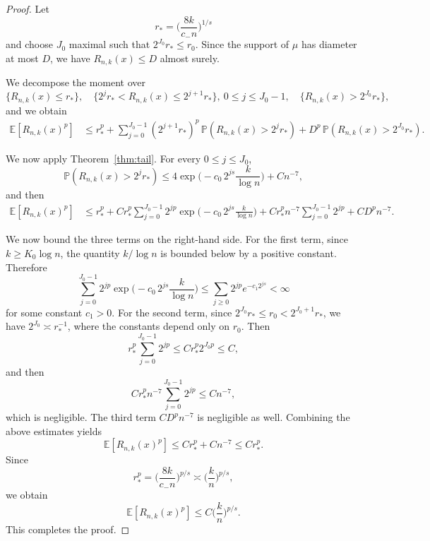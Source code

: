 \documentclass[10pt,a4paper]{amsart}
\begin{document}
\begin{proof}

Let $$r_* = \Big(\frac{8k}{c_- n}\Big)^{1/s}$$ and choose \(J_0\) maximal such that $2^{J_0}r_* \le r_0$. Since the support of \(\mu\) has diameter at most \(D\), we have $R_{n,k}(x)\le D$ almost surely.

We decompose the moment over
\[
\{R_{n,k}(x)\le r_*\},
\quad
\{2^j r_* < R_{n,k}(x)\le 2^{j+1}r_*\},\ 0\le j\le J_0-1,
\quad
\{R_{n,k}(x)>2^{J_0}r_*\},
\]
and we obtain
\begin{align*}
\mathbb E[R_{n,k}(x)^p]
&\le r_*^p
+ \sum_{j=0}^{J_0-1}(2^{j+1}r_*)^p\,\mathbb P(R_{n,k}(x)>2^j r_*) + D^p\,\mathbb P(R_{n,k}(x)>2^{J_0}r_*).
\end{align*}

We now apply Theorem~\ref{thm:tail}. For every \(0\le j\le J_0\),
\[
\mathbb P(R_{n,k}(x)>2^j r_*)
\le
4\exp \Big(-c_0\,2^{js}\frac{k}{\log n}\Big)+Cn^{-7},
\]
and then
\begin{align*}
\mathbb E[R_{n,k}(x)^p]
&\le r_*^p
+ C r_*^p \sum_{j=0}^{J_0-1}2^{jp}
\exp \Big(-c_0\,2^{js}\frac{k}{\log n}\Big) + C r_*^p n^{-7}\sum_{j=0}^{J_0-1}2^{jp}
+ C D^p n^{-7}.
\end{align*}

We now bound the three terms on the right-hand side. For the first term, since \(k\ge K_0\log n\), the quantity \(k/\log n\) is bounded below by a positive constant. Therefore
\[
\sum_{j=0}^{J_0-1}2^{jp}
\exp \Big(-c_0\,2^{js}\frac{k}{\log n}\Big)
\le
\sum_{j\ge 0}2^{jp}e^{-c_1 2^{js}}
<\infty
\]
for some constant \(c_1>0\). For the second term, since \(2^{J_0}r_*\le r_0<2^{J_0+1}r_*\), we have $2^{J_0}\asymp r_*^{-1}$, where the constants depend only on \(r_0\). Then
\[
r_*^p\sum_{j=0}^{J_0-1}2^{jp}
\le
C r_*^p 2^{J_0 p}
\le C,
\]
and then
\[
C r_*^p n^{-7}\sum_{j=0}^{J_0-1}2^{jp}
\le C n^{-7},
\]
which is negligible. The third term \(C D^p n^{-7}\) is negligible as well. Combining the above estimates yields
\[
\mathbb E[R_{n,k}(x)^p]
\le C r_*^p + C n^{-7}
\le C r_*^p.
\]
Since
\[
r_*^p
=
\Big(\frac{8k}{c_- n}\Big)^{p/s}
\asymp
\Big(\frac{k}{n}\Big)^{p/s},
\]
we obtain
\[
\mathbb E[R_{n,k}(x)^p]
\le
C\Big(\frac{k}{n}\Big)^{p/s}.
\]
This completes the proof.
\end{proof}
\end{document}
